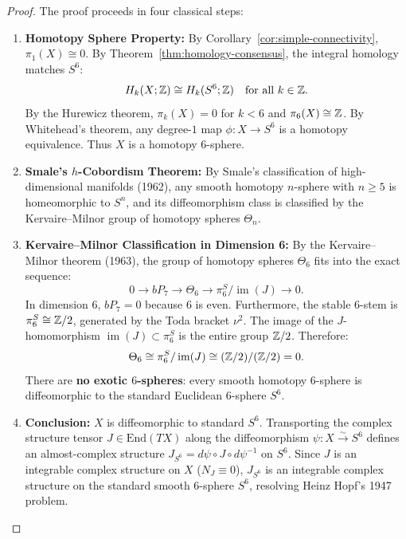 \begin{proof}
The proof proceeds in four classical steps:
\begin{enumerate}[label=\textbf{Step \arabic*:}, leftmargin=*]
    \item \textbf{Homotopy Sphere Property:}
    By Corollary~\ref{cor:simple-connectivity}, $\pi_1(X) \cong 0$.
    By Theorem~\ref{thm:homology-consensus}, the integral homology matches $S^6$:
    \[
    H_k(X; \mathbb{Z}) \cong H_k(S^6; \mathbb{Z}) \quad \text{for all } k \in \mathbb{Z}.
    \]
    By the Hurewicz theorem, $\pi_k(X) = 0$ for $k < 6$ and $\pi_6(X) \cong \mathbb{Z}$.
    By Whitehead's theorem, any degree-$1$ map $\phi \colon X \to S^6$ is a homotopy equivalence.
    Thus $X$ is a homotopy $6$-sphere.

    \item \textbf{Smale's $h$-Cobordism Theorem:}
    By Smale's classification of high-dimensional manifolds (1962), any smooth homotopy $n$-sphere with $n \ge 5$ is homeomorphic to $S^n$, and its diffeomorphism class is classified by the Kervaire--Milnor group of homotopy spheres $\Theta_n$.

    \item \textbf{Kervaire--Milnor Classification in Dimension 6:}
    By the Kervaire--Milnor theorem (1963), the group of homotopy spheres $\Theta_6$ fits into the exact sequence:
    \[
    0 \to bP_7 \to \Theta_6 \to \pi_6^S / \operatorname{im}(J) \to 0.
    \]
    In dimension $6$, $bP_7 = 0$ because $6$ is even.
    Furthermore, the stable $6$-stem is $\pi_6^S \cong \mathbb{Z}/2$, generated by the Toda bracket $\nu^2$.
    The image of the $J$-homomorphism $\operatorname{im}(J) \subset \pi_6^S$ is the entire group $\mathbb{Z}/2$.
    Therefore:
    \[
    \Theta_6 \cong \pi_6^S / \operatorname{im}(J) \cong (\mathbb{Z}/2) / (\mathbb{Z}/2) = 0.
    \]
    There are \textbf{no exotic $6$-spheres}: every smooth homotopy $6$-sphere is diffeomorphic to the standard Euclidean $6$-sphere $S^6$.

    \item \textbf{Conclusion:}
    $X$ is diffeomorphic to standard $S^6$.
    Transporting the complex structure tensor $J \in \mathrm{End}(TX)$ along the diffeomorphism $\psi \colon X \xrightarrow{\sim} S^6$ defines an almost-complex structure $J_{S^6} = d\psi \circ J \circ d\psi^{-1}$ on $S^6$.
    Since $J$ is an integrable complex structure on $X$ ($N_J \equiv 0$), $J_{S^6}$ is an integrable complex structure on the standard smooth $6$-sphere $S^6$, resolving Heinz Hopf's 1947 problem.
\end{enumerate}
\end{proof}
